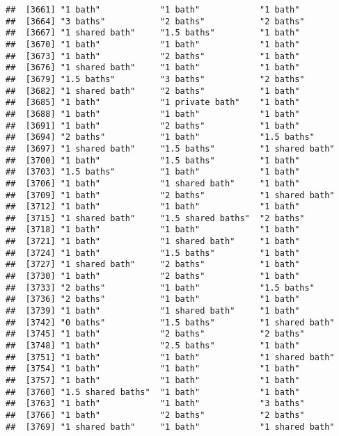 \documentclass[
]{article}
\begin{document}
\begin{verbatim}
##  [3661] "1 bath"            "1 bath"            "1 bath"           
##  [3664] "3 baths"           "2 baths"           "2 baths"          
##  [3667] "1 shared bath"     "1.5 baths"         "1 bath"           
##  [3670] "1 bath"            "1 bath"            "1 bath"           
##  [3673] "1 bath"            "2 baths"           "1 bath"           
##  [3676] "1 shared bath"     "1 bath"            "1 bath"           
##  [3679] "1.5 baths"         "3 baths"           "2 baths"          
##  [3682] "1 shared bath"     "2 baths"           "1 bath"           
##  [3685] "1 bath"            "1 private bath"    "1 bath"           
##  [3688] "1 bath"            "1 bath"            "1 bath"           
##  [3691] "1 bath"            "2 baths"           "1 bath"           
##  [3694] "2 baths"           "1 bath"            "1.5 baths"        
##  [3697] "1 shared bath"     "1.5 baths"         "1 shared bath"    
##  [3700] "1 bath"            "1.5 baths"         "1 bath"           
##  [3703] "1.5 baths"         "1 bath"            "1 bath"           
##  [3706] "1 bath"            "1 shared bath"     "1 bath"           
##  [3709] "1 bath"            "2 baths"           "1 shared bath"    
##  [3712] "1 bath"            "1 bath"            "1 bath"           
##  [3715] "1 shared bath"     "1.5 shared baths"  "2 baths"          
##  [3718] "1 bath"            "1 bath"            "1 bath"           
##  [3721] "1 bath"            "1 shared bath"     "1 bath"           
##  [3724] "1 bath"            "1.5 baths"         "1 bath"           
##  [3727] "1 shared bath"     "2 baths"           "1 bath"           
##  [3730] "1 bath"            "2 baths"           "1 bath"           
##  [3733] "2 baths"           "1 bath"            "1.5 baths"        
##  [3736] "2 baths"           "1 bath"            "1 bath"           
##  [3739] "1 bath"            "1 shared bath"     "1 bath"           
##  [3742] "0 baths"           "1.5 baths"         "1 shared bath"    
##  [3745] "1 bath"            "2 baths"           "2 baths"          
##  [3748] "1 bath"            "2.5 baths"         "1 bath"           
##  [3751] "1 bath"            "1 bath"            "1 shared bath"    
##  [3754] "1 bath"            "1 bath"            "1 bath"           
##  [3757] "1 bath"            "1 bath"            "1 bath"           
##  [3760] "1.5 shared baths"  "1 bath"            "1 bath"           
##  [3763] "1 bath"            "1 bath"            "3 baths"          
##  [3766] "1 bath"            "2 baths"           "2 baths"          
##  [3769] "1 shared bath"     "1 bath"            "1 shared bath"    

\end{verbatim}
\end{document}

